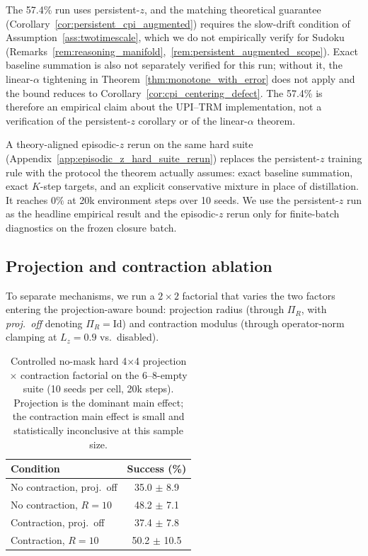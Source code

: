 \documentclass{article}
\theoremstyle{plain}
\theoremstyle{definition}
\theoremstyle{remark}
\begin{document}
The 57.4\% run uses persistent-$z$, and the matching theoretical guarantee (Corollary~\ref{cor:persistent_cpi_augmented}) requires the slow-drift condition of Assumption~\ref{ass:twotimescale}, which we do not empirically verify for Sudoku (Remarks~\ref{rem:reasoning_manifold},~\ref{rem:persistent_augmented_scope}). Exact baseline summation is also not separately verified for this run; without it, the linear-$\alpha$ tightening in Theorem~\ref{thm:monotone_with_error} does not apply and the bound reduces to Corollary~\ref{cor:cpi_centering_defect}. The 57.4\% is therefore an empirical claim about the UPI--TRM implementation, not a verification of the persistent-$z$ corollary or of the linear-$\alpha$ theorem.

A theory-aligned episodic-$z$ rerun on the same hard suite (Appendix~\ref{app:episodic_z_hard_suite_rerun}) replaces the persistent-$z$ training rule with the protocol the theorem actually assumes: exact baseline summation, exact $K$-step targets, and an explicit conservative mixture in place of distillation. It reaches $0\%$ at 20k environment steps over 10 seeds. We use the persistent-$z$ run as the headline empirical result and the episodic-$z$ rerun only for finite-batch diagnostics on the frozen closure batch.

\subsection{Projection and contraction ablation}
\label{sec:projection_contraction_ablation}

To separate mechanisms, we run a $2\times 2$ factorial that varies the two factors entering the projection-aware bound: projection radius (through $\Pi_R$, with \emph{proj.\ off} denoting $\Pi_R=\mathrm{Id}$) and contraction modulus (through operator-norm clamping at $L_z=0.9$ vs.\ disabled).

\begin{table}[t]
\caption{Controlled no-mask hard 4$\times$4 projection $\times$ contraction factorial on the 6--8-empty suite (10 seeds per cell, 20k steps). Projection is the dominant main effect; the contraction main effect is small and statistically inconclusive at this sample size.}
\label{tab:controlled_2x2_main_body}
\centering
\small
\begin{tabular}{@{}lc@{}}
\toprule
Condition & Success (\%) \\
\midrule
No contraction, proj.\ off & 35.0 $\pm$ 8.9 \\
No contraction, $R{=}10$ & 48.2 $\pm$ 7.1 \\
Contraction, proj.\ off & 37.4 $\pm$ 7.8 \\
Contraction, $R{=}10$ & 50.2 $\pm$ 10.5 \\
\bottomrule
\end{tabular}
\end{table}
\end{document}
